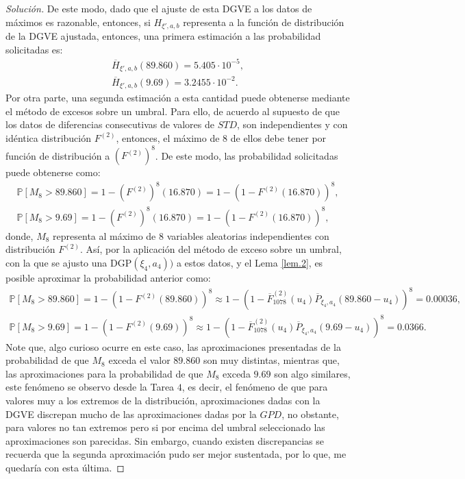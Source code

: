 \documentclass[10.5pt,notitlepage]{article}
\newenvironment{solucion}
  {\begin{proof}[Solución]}
  {\end{proof}}
\newcommand{\PP}{\mathbb{P}}
\theoremstyle{plain}
\begin{document}
\begin{solucion}
De este modo, dado que el ajuste de esta DGVE a los datos de máximos es razonable, entonces, si \(H_{\xi',a,b}\) representa a la función de distribución de la DGVE ajustada, entonces, una primera estimación a las probabilidad solicitadas es:
\begin{align*}  
\overline{H}_{\xi', a, b}(89.860) =5.405\cdot 10^{-5},\\ 
\overline{H}_{\xi', a, b}(9.69) = 3.2455\cdot 10^{-2}.
\end{align*}
Por otra parte, una segunda estimación a esta cantidad puede obtenerse mediante el método de excesos sobre un umbral. Para ello, de acuerdo al supuesto de que los datos de diferencias consecutivas de valores de \(STD\), son independientes y con idéntica distribución \(F^{(2)}\), entonces, el máximo de \(8\) de ellos debe tener por función de distribución a \((F^{(2)})^{8}\). De este modo, las probabilidad solicitadas puede obtenerse como: 
\begin{align*}
\PP[M_{8} > 89.860] =1 - (F^{(2)})^{8}(16.870) = 1 - (1 - F^{(2)}(16.870))^{8}, \\
\PP[M_{8} > 9.69] =1 - (F^{(2)})^{8}(16.870) = 1 - (1 - F^{(2)}(16.870))^{8}, 
\end{align*}
donde, \(M_{8}\) representa al máximo de \(8\) variables aleatorias independientes con distribución \(F^{(2)}\). Así, por la aplicación del método de exceso sobre un umbral, con la que se ajusto una DGP\((\xi_4,a_4))\) a estos datos, y el Lema \ref{lem.2}, es posible aproximar la probabilidad anterior como: 
\begin{align*}
\PP[M_{8} > 89.860] =1 - (1 - F^{(2)}(89.860))^{8}\approx1 - (1- \overline{F}^{(2)}_{1078}(u_4)\overline{P}_{\xi_4,a_{4}}(89.860 - u_4))^{8} = 0.00036, \\
\PP[M_{8} > 9.69] =1 - (1 - F^{(2)}(9.69))^{8}\approx1 - (1- \overline{F}^{(2)}_{1078}(u_4)\overline{P}_{\xi_4,a_{4}}(9.69 - u_4))^{8} = 0.0366. 
\end{align*} 
Note que, algo curioso ocurre en este caso, las aproximaciones presentadas de la probabilidad de que \(M_8\) exceda el valor \(89.860\) son muy distintas, mientras que, las aproximaciones para la probabilidad de que \(M_8\) exceda \(9.69\) son algo similares, este fenómeno se observo desde la Tarea \(4\), es decir, el fenómeno de que para valores muy a los extremos de la distribución, aproximaciones dadas con la DGVE discrepan mucho de las aproximaciones dadas por la \(GPD\), no obstante, para valores no tan extremos pero si por encima del umbral seleccionado las aproximaciones son parecidas. Sin embargo, cuando existen discrepancias se recuerda que la segunda aproximación pudo ser mejor sustentada, por lo que, me quedaría con esta última.


\end{solucion}
\end{document}
